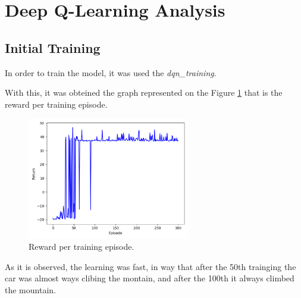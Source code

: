 \documentclass[journal]{IEEEtran}
\begin{document}






\section{Deep Q-Learning Analysis}

\subsection{Initial Training}

In order to train the model, it was used the \textit{dqn\_training}.

With this, it was obteined the graph represented on the Figure \ref{fig:train} that is the reward per training episode.

\begin{figure}
  \begin{center}
  \includegraphics[width=2.8in]{./../code/output/first_train.png}
  \caption{Reward per training episode.}
  \label{fig:train}
  \end{center}
\end{figure}

As it is observed, the learning was fast, in way that after the 50th trainging the car was almost ways clibing the montain, and after the 100th it always climbed the mountain.
\end{document}
